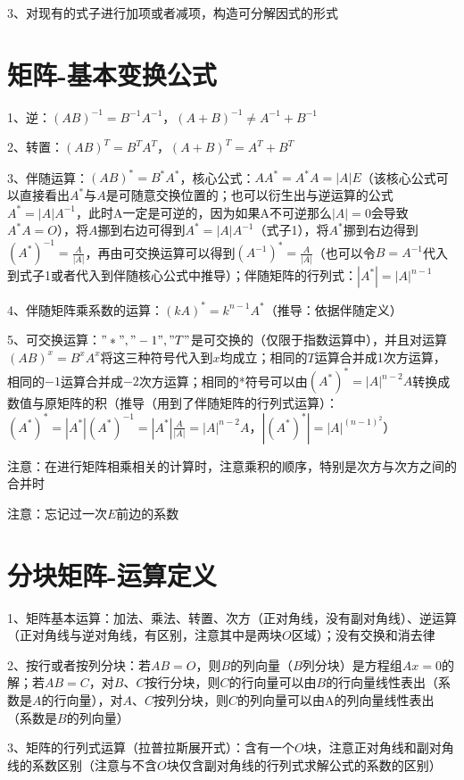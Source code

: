 3、对现有的式子进行加项或者减项，构造可分解因式的形式

\section{矩阵-基本变换公式}

1、逆：$(AB)^{-1}=B^{-1} A^{-1}$，$(A+B)^{-1}\ne A^{-1} + B^{-1}$

2、转置：$(AB)^T=B^TA^T$，$(A+B)^T=A^T + B^T$

3、伴随运算：$(AB)^*=B^*A^*$，核心公式：$AA^*=A^*A=|A|E$（该核心公式可以直接看出$A^*$与$A$是可随意交换位置的；也可以衍生出与逆运算的公式$A^*=|A|A^{-1}$，此时A一定是可逆的，因为如果A不可逆那么$|A|=0$会导致$A^*A=O$），将$A$挪到右边可得到$A^*=|A|A^{-1}$（式子1），将$A^*$挪到右边得到$(A^*)^{-1}=\frac{A}{|A|}$，再由可交换运算可以得到$(A^{-1})^*=\frac{A}{|A|}$（也可以令$B=A^{-1}$代入到式子1或者代入到伴随核心公式中推导）；伴随矩阵的行列式：$|A^*|=|A|^{n-1}$

4、伴随矩阵乘系数的运算：$(kA)^*=k^{n-1}A^*$（推导：依据伴随定义）

5、可交换运算：$"*","-1","T"$是可交换的（仅限于指数运算中），并且对运算$(AB)^x=B^xA^x$将这三种符号代入到$x$均成立；相同的$T$运算合并成1次方运算，相同的$-1$运算合并成$-2$次方运算；相同的*符号可以由$(A^*)^{*}=|A|^{n-2}A$转换成数值与原矩阵的积（推导（用到了伴随矩阵的行列式运算）：$(A^*)^{*}=|A^*|(A^*)^{-1}=|A^*|\frac{A}{|A|}=|A|^{n-2}A$，$|(A^*)^{*}|=|A|^{(n-1)^2}$）

注意：在进行矩阵相乘相关的计算时，注意乘积的顺序，特别是次方与次方之间的合并时

注意：忘记过一次$E$前边的系数

\section{分块矩阵-运算定义}

1、矩阵基本运算：加法、乘法、转置、次方（正对角线，没有副对角线）、逆运算（正对角线与逆对角线，有区别，注意其中是两块$O$区域）；没有交换和消去律

2、按行或者按列分块：若$AB=O$，则$B$的列向量（$B$列分块）是方程组$Ax=0$的解；若$AB=C$，对$B、C$按行分块，则$C$的行向量可以由$B$的行向量线性表出（系数是$A$的行向量），对$A、C$按列分块，则$C$的列向量可以由A的列向量线性表出（系数是$B$的列向量）

3、矩阵的行列式运算（拉普拉斯展开式）：含有一个$O$块，注意正对角线和副对角线的系数区别（注意与不含$O$块仅含副对角线的行列式求解公式的系数的区别）

